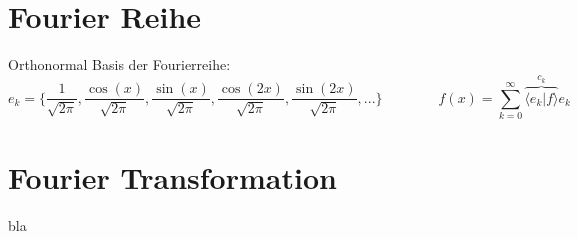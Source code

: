 \section{Fourier Reihe}

Orthonormal Basis der Fourierreihe:
\[  
	e_k=\{\frac{1}{\sqrt{2 \pi}}, \frac{\cos(x)}{\sqrt{2 \pi}}, \frac{\sin(x)}{\sqrt{2 \pi}}, \frac{\cos(2x)}{\sqrt{2 \pi}}, \frac{\sin(2x)}{\sqrt{2 \pi}}, ... \} 
	\qquad \qquad
	f(x) = \sum_{k=0}^{\infty}\overbrace{\langle e_k|f \rangle}^{c_k} e_k
\]

\newpage
\section{Fourier Transformation}

bla
